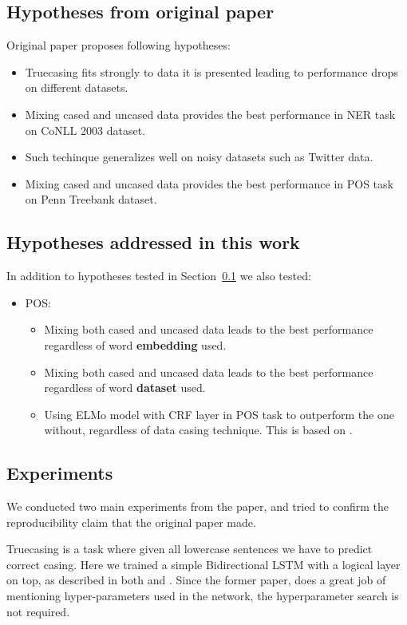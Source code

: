 \documentclass[11pt,a4paper]{article}
\begin{document}
\subsection{Hypotheses from original paper}
\label{sec:original_hypotheses}
Original paper proposes following hypotheses:
\begin{itemize}
    \item Truecasing fits strongly to data it is presented leading to performance drops on different datasets.
    \item Mixing cased and uncased data provides the best performance in NER task on CoNLL 2003 dataset.
    \item Such techinque generalizes well on noisy datasets such as Twitter data.
    \item Mixing cased and uncased data provides the best performance in POS task on Penn Treebank dataset.
\end{itemize}

\subsection{Hypotheses addressed in this work}
\label{sec:current_hypotheses}
In addition to hypotheses tested in Section~\ref{sec:original_hypotheses} we also tested:
\begin{itemize}
    \item POS:
    \begin{itemize}
        \item Mixing both cased and uncased data leads to the best performance regardless of word \textbf{embedding} used.
        \item Mixing both cased and uncased data leads to the best performance regardless of word \textbf{dataset} used.
        \item Using ELMo model with CRF layer in POS task to outperform the one without, regardless of data casing technique. This is based on \cite{BiLSTM-CRF}.
    \end{itemize}
\end{itemize}


\subsection{Experiments}
We conducted two main experiments from the paper, and tried to confirm the reproducibility claim that the original paper made.

Truecasing is a task where given all lowercase sentences we have to predict correct casing. Here we trained a simple Bidirectional LSTM with a logical layer on top, as described in both \cite{ner-and-pos-original} and \cite{susanto-etal-2016-learning}. Since the former paper, does a great job of mentioning hyper-parameters used in the network, the hyperparameter search is not required.
\end{document}
